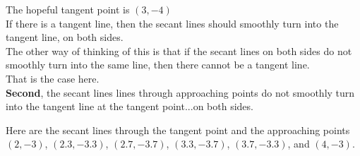 \documentclass{ximera}
\begin{document}
The hopeful tangent point is $(3, -4)$ \\


If there is a tangent line, then the secant lines should smoothly turn into the tangent line, on both sides.  \\


The other way of thinking of this is that if the secant lines on both sides do not smoothly turn into the same line, then there cannot be a tangent line. \\

That is the case here. \\








\textbf{Second}, the secant lines lines through approaching points do not smoothly turn into the tangent line at the tangent point...on both sides.


Here are the secant lines through the tangent point and the approaching points $(2, -3)$, $(2.3, -3.3)$, $(2.7, -3.7)$, $(3.3, -3.7)$, $(3.7, -3.3)$, and $(4, -3)$.





\begin{image}
\end{image}
\end{document}
